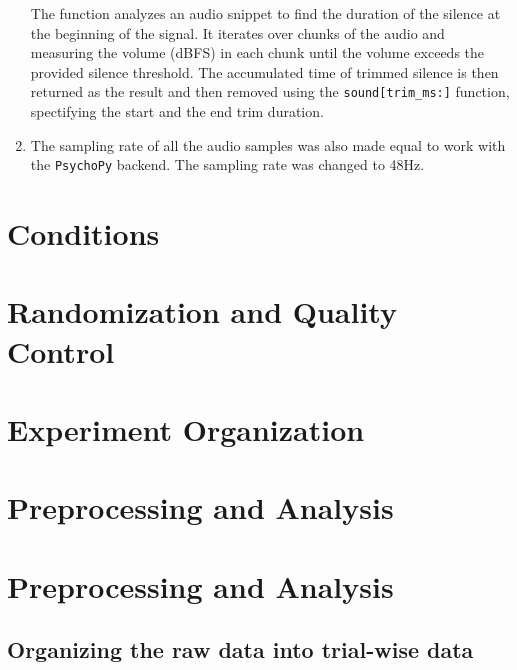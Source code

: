 \documentclass[
  a4paper,
]{article}
\begin{document}
\begin{enumerate}
  The function analyzes an audio snippet to find the duration of the
  silence at the beginning of the signal. It iterates over chunks of the
  audio and measuring the volume (dBFS) in each chunk until the volume
  exceeds the provided silence threshold. The accumulated time of
  trimmed silence is then returned as the result and then removed using
  the \texttt{sound{[}trim\_ms:{]}} function, spectifying the start and
  the end trim duration.
\item
  The sampling rate of all the audio samples was also made equal to work
  with the \texttt{PsychoPy} backend. The sampling rate was changed to
  48Hz.
\end{enumerate}

\hypertarget{conditions}{%
\section{Conditions}\label{conditions}}

\hypertarget{randomization-and-quality-control}{%
\section{Randomization and Quality
Control}\label{randomization-and-quality-control}}

\hypertarget{experiment-organization}{%
\section{Experiment Organization}\label{experiment-organization}}

\hypertarget{preprocessing-and-analysis}{%
\section{Preprocessing and Analysis}\label{preprocessing-and-analysis}}

\hypertarget{preprocessing-and-analysis-1}{%
\section{Preprocessing and
Analysis}\label{preprocessing-and-analysis-1}}

\hypertarget{organizing-the-raw-data-into-trial-wise-data}{%
\subsection{Organizing the raw data into trial-wise
data}\label{organizing-the-raw-data-into-trial-wise-data}}
\end{document}
